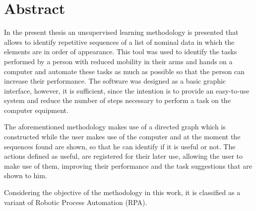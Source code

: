 \chapter{Abstract}
\label{sec:Abstract}

In the present thesis an unsupervised learning methodology is presented that 
 allows to identify repetitive sequences of a list of nominal data in which 
 the elements are in order of appearance. This tool was used to identify the 
 tasks performed by a person with reduced mobility in their arms and hands 
 on a computer and automate these tasks as much as possible so that the 
 person can increase their performance. The software was designed as a basic 
 graphic interface, however, it is sufficient, since the intention is to 
 provide an easy-to-use system and reduce the number of steps necessary to 
 perform a task on the computer equipment.


The aforementioned methodology makes use of a directed graph which is 
 constructed while the user makes use of the computer and at the moment the 
 sequences found are shown, so that he can identify if it is useful or not. 
 The actions defined as useful, are registered for their later use, allowing 
 the user to make use of them, improving their performance and the task 
 suggestions that are shown to him.


Considering the objective of the methodology in this work, it is classified    
 as a variant of Robotic Process Automation (RPA).